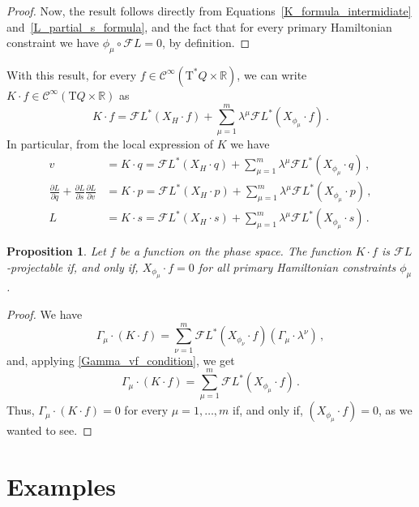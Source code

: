 \documentclass[11pt]{article}
\theoremstyle{plain}
\newtheorem{proposition}[theorem]{Proposition}
\theoremstyle{definition}
\newcommand{\R}{\mathbb{R}}
\newcommand{\Cinfty}{\mathscr{C}^\infty}
\newcommand{\T}{{\mathrm T}}
\let\Tan\T
\newcommand{\parder}[2]{\frac{\partial #1}{\partial #2}}
\def\Tan{\mathrm{T}}
\def\FL{\mathcal{F} L}
\begin{document}
\begin{proof}
Now, the result follows directly from Equations~\eqref{K_formula_intermidiate} and~\eqref{L_partial_s_formula}, and the fact that for every primary Hamiltonian constraint we have $\phi_{\mu}\circ \FL = 0$, by definition.
\end{proof}


With this result, for every $f \in \Cinfty(\Tan^*Q\times\R)$, we can write $K\cdot f \in \Cinfty(\Tan Q\times \R)$ as
\begin{equation}
    K\cdot f = \FL ^* (X_H\cdot f) + \sum _{\mu = 1} ^m \lambda ^{\mu} \FL^*(X_{\phi_\mu} \cdot  f)\,.
\end{equation}
In particular, from the local expression of $K$ we have
\begin{align} 
      v &= K\cdot q = \FL ^* (X_H\cdot q) + \sum _{\mu = 1} ^m \lambda ^{\mu} \FL^*(X_{\phi_\mu}\cdot  q)\,, %
  \\
    \parder{L}{q} +\parder{L}{s}\parder{L}{v} &= K\cdot p = \FL ^* (X_H\cdot p) + \sum _{\mu = 1} ^m \lambda ^{\mu} \FL^*(X_{\phi_\mu}\cdot p)\,,
    \\
    L &= K\cdot s= \FL ^* (X_H\cdot s) + \sum _{\mu = 1} ^m \lambda ^{\mu} \FL^*(X_{\phi_\mu}\cdot s)\,.
\end{align}

\begin{proposition}
     Let $f$ be a function on the phase space. The function $K\cdot f$ is $\FL$-projectable if, and only if, $X_{\phi_{\mu}}\cdot f=0$ for all primary Hamiltonian constraints $\phi_{\mu}$. 
\end{proposition}
\begin{proof}
    We have
    $$\Gamma_{\mu}\cdot(K\cdot f) = \sum_{\nu=1}^m \FL^*(X_{ \phi_{\nu}}\cdot f)(\Gamma_{\mu} \cdot {\lambda}^{\nu}) \,,$$
    and, applying \eqref{Gamma_vf_condition}, we get
    $$\Gamma_{\mu}\cdot(K\cdot f) =\sum_{\mu=1}^m \FL^*(X_{\phi_{\mu}}\cdot f)\,.$$
    Thus, $\Gamma_\mu\cdot(K\cdot f)=0$ for every $\mu=1,\dots,m$ if, and only if, $(X_{\phi_{\mu}}\cdot f)=0$, as we wanted to see.
\end{proof}



\section{Examples}\label{sec:examples}
\end{document}
